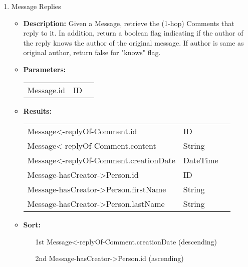 {\begin{enumerate}
  \item Message Replies
    \begin{itemize}
      \item \textbf{Description:}
        Given a Message, retrieve the (1-hop) Comments that reply to it.
        In addition, return a boolean flag indicating if the author of the reply knows the author of the original message.
        If author is same as original author, return false for "knows" flag.
      \item \textbf{Parameters:} \\
        \begin{tabular}{lll}
          Message.id 										& ID \\
        \end{tabular}
      \item \textbf{Results:} \\
        \begin{tabular}{lll}
          Message<-replyOf-Comment.id                       & ID \\
          Message<-replyOf-Comment.content                       & String \\
          Message<-replyOf-Comment.creationDate                       & DateTime \\
          Message-hasCreator->Person.id     									& ID \\
          Message-hasCreator->Person.firstName    									& String \\
          Message-hasCreator->Person.lastName     									& String \\
        \end{tabular}
      \item \textbf{Sort:}
        \begin{itemize}
          \item[1st] Message<-replyOf-Comment.creationDate (descending)
          \item[2nd] Message-hasCreator->Person.id (ascending)
        \end{itemize}
    \end{itemize}
\end{enumerate}
}

